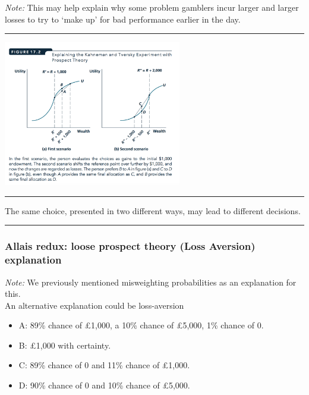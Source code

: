\documentclass[]{article}
\providecommand{\tightlist}{%
  \setlength{\itemsep}{0pt}\setlength{\parskip}{0pt}}
\begin{document}
\emph{Note:} This may help explain why some problem gamblers incur
larger and larger losses to try to `make up' for bad performance earlier
in the day.

\begin{center}\rule{0.5\linewidth}{\linethickness}\end{center}

\includegraphics[height=2.5in]{picsfigs/ktprospect.png}

\begin{center}\rule{0.5\linewidth}{\linethickness}\end{center}

\begin{description}
\tightlist
\item[Framing effect]
The same choice, presented in two different ways, may lead to different
decisions.
\end{description}

\begin{center}\rule{0.5\linewidth}{\linethickness}\end{center}

\hypertarget{allais-redux-loose-prospect-theory-loss-aversion-explanation}{%
\subsubsection{Allais redux: loose prospect theory (Loss Aversion)
explanation}\label{allais-redux-loose-prospect-theory-loss-aversion-explanation}}

\emph{Note:} We previously mentioned misweighting probabilities as an
explanation for this.\\
An alternative explanation could be loss-aversion

\begin{itemize}
\tightlist
\item
  A: 89\% chance of \pounds1,000, a 10\% chance of \pounds5,000, 1\%
  chance of 0.
\item
  B: \pounds1,000 with certainty.
\item
  C: 89\% chance of 0 and 11\% chance of \pounds1,000.
\item
  D: 90\% chance of 0 and 10\% chance of \pounds5,000.
\end{itemize}
\end{document}
